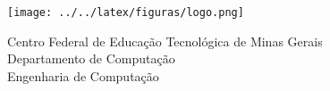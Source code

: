 \begin{flushleft}
\begin{minipage}{0.25\textwidth}
\texttt{[image: ../../latex/figuras/logo.png]}  
\end{minipage}
\hfill
\begin{minipage}{0.7\textwidth}  
\begin{flushleft} \begin{center} 
Centro Federal de Educação Tecnológica de Minas Gerais \\
Departamento de Computação \\
Engenharia de Computação
\end{center} \end{flushleft} 
\end{minipage}
\end{flushleft} 